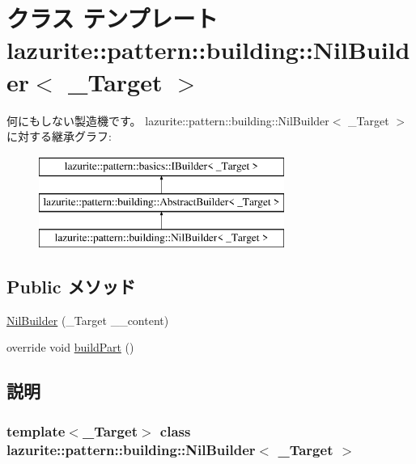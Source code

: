\hypertarget{classlazurite_1_1pattern_1_1building_1_1_nil_builder_3_01___target_01_4}{
\section{クラス テンプレート lazurite::pattern::building::NilBuilder$<$ \_\-Target $>$}
\label{classlazurite_1_1pattern_1_1building_1_1_nil_builder_3_01___target_01_4}
}


何にもしない製造機です。  
lazurite::pattern::building::NilBuilder$<$ \_\-Target $>$に対する継承グラフ:\begin{figure}[H]
\begin{center}
\leavevmode
\includegraphics[height=3cm]{classlazurite_1_1pattern_1_1building_1_1_nil_builder_3_01___target_01_4}
\end{center}
\end{figure}
\subsection*{Public メソッド}
\begin{DoxyCompactItemize}
\item 
\hyperlink{classlazurite_1_1pattern_1_1building_1_1_nil_builder_3_01___target_01_4_a8005b4e5b30ae89db167f639e52cc075}{NilBuilder} (\_\-Target \_\-\_\-content)
\item 
override void \hyperlink{classlazurite_1_1pattern_1_1building_1_1_nil_builder_3_01___target_01_4_a569c538e03c084f2ccd3678ca368383a}{buildPart} ()
\end{DoxyCompactItemize}


\subsection{説明}
\subsubsection*{template$<$\_\-Target$>$ class lazurite::pattern::building::NilBuilder$<$ \_\-Target $>$}

